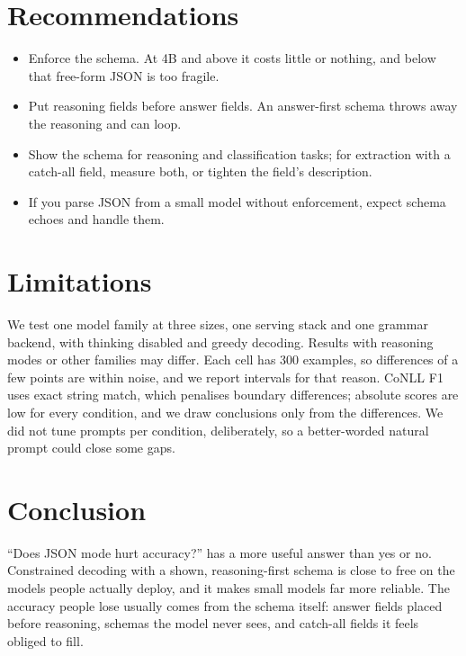 \documentclass[10pt,twocolumn]{article}
\begin{document}
\section{Recommendations}

\begin{itemize}
\item Enforce the schema. At 4B and above it costs little or nothing, and below that free-form JSON is too fragile.
\item Put reasoning fields before answer fields. An answer-first schema throws away the reasoning and can loop.
\item Show the schema for reasoning and classification tasks; for extraction with a catch-all field, measure both, or
tighten the field's description.
\item If you parse JSON from a small model without enforcement, expect schema echoes and handle them.
\end{itemize}

\section{Limitations}

We test one model family at three sizes, one serving stack and one grammar backend, with thinking disabled and greedy
decoding. Results with reasoning modes or other families may differ. Each cell has 300 examples, so differences of a
few points are within noise, and we report intervals for that reason. CoNLL F1 uses exact string match, which
penalises boundary differences; absolute scores are low for every condition, and we draw conclusions only from the
differences. We did not tune prompts per condition, deliberately, so a better-worded natural prompt could close some
gaps.

\section{Conclusion}

``Does JSON mode hurt accuracy?'' has a more useful answer than yes or no. Constrained decoding with a shown,
reasoning-first schema is close to free on the models people actually deploy, and it makes small models far more
reliable. The accuracy people lose usually comes from the schema itself: answer fields placed before reasoning, schemas
the model never sees, and catch-all fields it feels obliged to fill.
\end{document}
